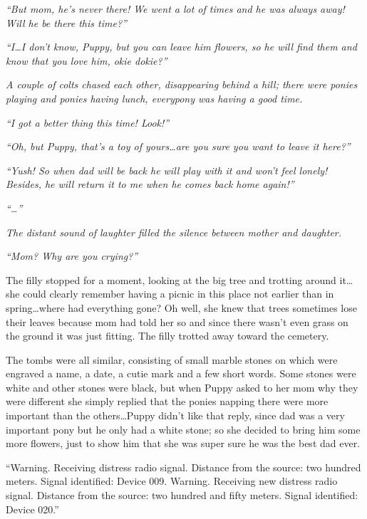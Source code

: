 \emph{``But mom, he's never there! We went a lot of times and he was always away! Will he be there this time?''}

\emph{``I\dots I don't know, Puppy, but you can leave him flowers, so he will find them and know that you love him, okie dokie?''}

\emph{A couple of colts chased each other, disappearing behind a hill; there were ponies playing and ponies having lunch, everypony was having a good time.}

\emph{``I got a better thing this time! Look!''}

\emph{``Oh, but Puppy, that's a toy of yours\dots are you sure you want to leave it here?''}

\emph{``Yush! So when dad will be back he will play with it and won't feel lonely! Besides, he will return it to me when he comes back home again!''}

\emph{``\dots''}

\emph{The distant sound of laughter filled the silence between mother and daughter.}

\emph{``Mom? Why are you crying?''}

The filly stopped for a moment, looking at the big tree and trotting around it\dots she could clearly remember having a picnic in this place not earlier than in spring\dots where had everything gone? Oh well, she knew that trees sometimes lose their leaves because mom had told her so and since there wasn't even grass on the ground it was just fitting. The filly trotted away toward the cemetery.

\horizonline


The tombs were all similar, consisting of small marble stones on which were engraved a name, a date, a cutie mark and a few short words. Some stones were white and other stones were black, but when Puppy asked to her mom why they were different she simply replied that the ponies napping there were more important than the others\dots Puppy didn't like that reply, since dad was a very important pony but he only had a white stone; so she decided to bring him some more flowers, just to show him that she was super sure he was the best dad ever.

``{\mt Warning. Receiving distress radio signal. Distance from the source: two hundred meters. Signal identified: Device 009. Warning. Receiving new distress radio signal. Distance from the source: two hundred and fifty meters. Signal identified: Device 020.}''

